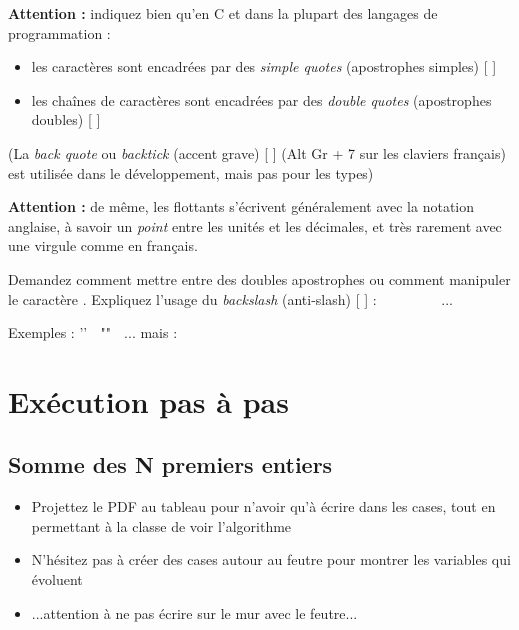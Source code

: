 \documentclass[11pt,a4paper]{article}
\begin{document}
\bigskip

\textbf{Attention : } indiquez bien qu'en C et dans la plupart des langages de programmation :
\begin{itemize}
\item les caractères sont encadrées par des \textit{simple quotes} (apostrophes simples) [  ]
\item les chaînes de caractères sont encadrées par des \textit{double quotes} (apostrophes doubles) [  ]
\end{itemize}

(La \textit{back quote} ou \textit{backtick} (accent grave) [ \TTBF{\textasciigrave} ] (Alt Gr + 7 sur les claviers français) est utilisée dans le développement, mais pas pour les types)

\medskip

\textbf{Attention : } de même, les flottants s'écrivent généralement avec la notation anglaise, à savoir un \textit{point} entre les unités et les décimales, et très rarement avec une virgule comme en français.

\medskip

Demandez comment mettre  entre des doubles apostrophes ou comment manipuler le caractère .
Expliquez l'usage du \textit{backslash} (anti-slash) [ \TTBF{\textbackslash} ] : $ \; $  $ \; $  $ \; $ \TTBF{\textbackslash{}\textasciigrave} $ \; $  $ \; $  $ \; $  $ \; $ ...

Exemples : '' $ \; $ "" $ \; $ ... mais :  $ \; $ 

\bigskip

\newpage


\section{Exécution pas à pas}

\subsection{Somme des N premiers entiers}

\bigskip

\begin{itemize}
\item Projettez le PDF au tableau pour n'avoir qu'à écrire dans les cases, tout en permettant à la classe de voir l'algorithme
\item N'hésitez pas à créer des cases autour au feutre pour montrer les variables qui évoluent
\item ...attention à ne pas écrire sur le mur avec le feutre...
\end{itemize}
\end{document}
